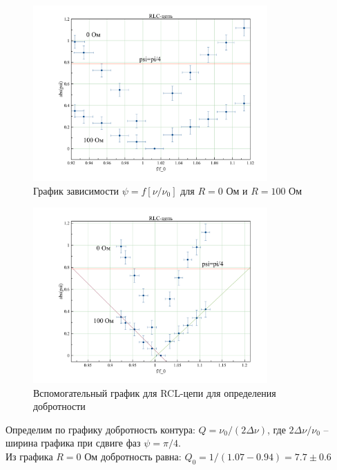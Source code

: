 \documentclass[a4paper, 12pt]{article}
\begin{document}
\begin {figure}[H]
	\begin{center}
		\includegraphics[width=0.8\textwidth]{RLC}
		\caption{График зависимости $\psi = f[\nu/\nu_0] \text{ для $R = 0$ Ом и $R = 100$ Ом}$}
	\end{center}
\end {figure}

\begin {figure}[H]
	\begin{center}
		\includegraphics[width=0.8\textwidth]{RLC_help}
		\caption{Вспомогательный график для RCL-цепи для определения добротности}
	\end{center}
\end {figure}
Определим по графику добротность контура: $Q = \nu_0/(2\Delta\nu)$, где $2\Delta\nu/\nu_0$ -- ширина графика при сдвиге фаз $\psi = \pi/4$. \\

Из графика $R = 0$ Ом добротность равна:
$Q_{0}= 1/(1.07-0.94) = 7.7 \pm 0.6$
\end{document}
